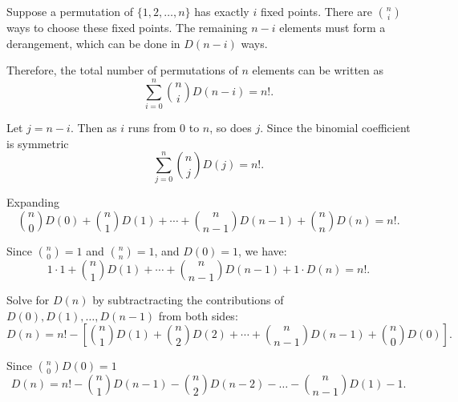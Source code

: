 \documentclass{report}
\begin{document}

\begin{proofWithHibiscus}
  Suppose a permutation of \(\{1,2,\dots,n\}\) has exactly \(i\) fixed points. 
  There are \(\binom{n}{i}\) ways to choose these fixed points. 
  The remaining \(n-i\) elements must form a derangement, which can be done in \(D(n-i)\) ways.

  \medskip 

  Therefore, the total number of permutations of \(n\) elements can be written as
  \[
  \sum_{i=0}^{n} \binom{n}{i} D(n-i) = n!.
  \]
  
  \bigskip

  Let \(j=n-i\). Then as \(i\) runs from 0 to \(n\), so does \(j\). Since the binomial coefficient is symmetric
  \[
  \sum_{j=0}^{n} \binom{n}{j} D(j) = n!.
  \]
  
  Expanding
  \[
  \binom{n}{0}D(0)+\binom{n}{1}D(1)+\cdots+\binom{n}{n-1}D(n-1)+\binom{n}{n}D(n) = n!.
  \]
  
  Since \(\binom{n}{0} = 1\) and \(\binom{n}{n} = 1\), and \(D(0)=1\), we have:
  \[
  1 \cdot 1 + \binom{n}{1}D(1)+\cdots+\binom{n}{n-1}D(n-1) + 1 \cdot D(n) = n!.
  \]
  
  \bigskip
  
  Solve for \(D(n)\) by subtractracting the contributions of \(D(0), D(1), \dots, D(n-1)\) from both sides:
  \[
  D(n) = n! - \left[\binom{n}{1}D(1)+\binom{n}{2}D(2)+\cdots+\binom{n}{n-1}D(n-1)+ \binom{n}{0}D(0)\right].
  \]
  
  Since \(\binom{n}{0}D(0)=1\)
  \[
  D(n) = n! - \binom{n}{1}D(n-1) - \binom{n}{2}D(n-2) - \dots - \binom{n}{n-1}D(1) - 1.
  \]
  
  
\end{proofWithHibiscus}
\end{document}
